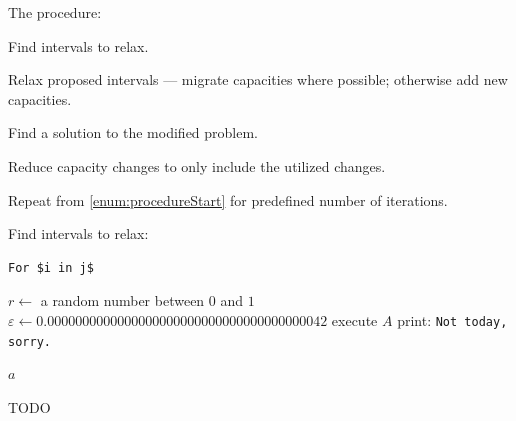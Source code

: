 The procedure:

\begin{steps}
    \item Find intervals to relax. \label{enum:procedureStart}
    \item Relax proposed intervals --- migrate capacities where possible; otherwise add new capacities.
    \item Find a solution to the modified problem.
    \item Reduce capacity changes to only include the utilized changes.
    \item Repeat from \cref{enum:procedureStart} for predefined number of iterations.
\end{steps}

Find intervals to relax:

\begin{verbatim}
For $i in j$
\end{verbatim}


\algrenewcommand\algorithmicdo{\textbf{:}}
\algrenewcommand\algorithmicthen{\textbf{:}}
\algrenewcommand{}

\begin{algorithm}
\begin{algorithmic}
	\State $r \gets$ a random number between $0$ and $1$
	\State $\varepsilon \gets 0.0000000000000000000000000000000000000042$
		\State execute $A$ 
	\Else
		\State print: \texttt{Not today, sorry.}
        \EndIf


    \State $a$
\EndFunction
\end{algorithmic}
\caption{TODO}
\label{alg:findIntervalsToRelax}
\end{algorithm}